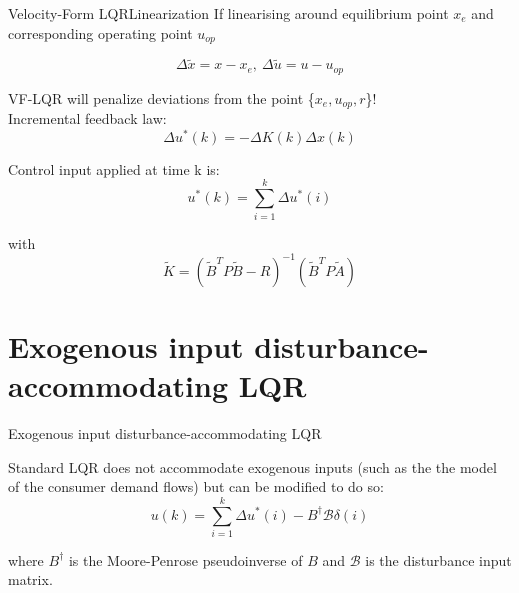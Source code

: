 \begin{frame}{Velocity-Form LQR}{Linearization}
	If linearising around equilibrium point $x_e$ and corresponding operating point $u_{op}$
		
	\begin{equation}\label{eq:DeltaInterpretation}
		\Delta \tilde{x} = x-x_e, \ \Delta \tilde{u} = u-u_{op}
	\end{equation}

	VF-LQR will penalize deviations from the point \{$x_e, u_{op}, r$\}!\\
	\medskip	
	Incremental feedback law:
	\begin{equation}\label{eq:ControlIncrementLaw}
		\Delta u^*(k) = -\Delta K(k) \Delta x(k) 
	\end{equation}
	
	Control input applied at time k is:
	\begin{equation}\label{eq:ActualControlApplied}
		u^*(k) = \sum_{i=1}^{k} \Delta u^*(i)
	\end{equation}

	with
	\begin{equation}
		\tilde{K} = (\tilde{B}^TP\tilde{B}-R)^{-1}(\tilde{B}^TP\tilde{A})
	\end{equation}
\end{frame}


\section{Exogenous input disturbance-accommodating LQR}
\begin{frame}{Exogenous input disturbance-accommodating LQR}

	Standard LQR does not accommodate exogenous inputs (such as the the model of the consumer demand flows) but can be modified to do so:
	\begin{equation}
		u(k) = \sum_{i=1}^{k} \Delta{u}^*(i) - B^\dagger \mathcal{B}\delta(i)
	\end{equation}
	
	where $B^\dagger$ is the Moore-Penrose pseudoinverse of $B$ and $\mathcal{B}$ is the disturbance input matrix.
\end{frame}
